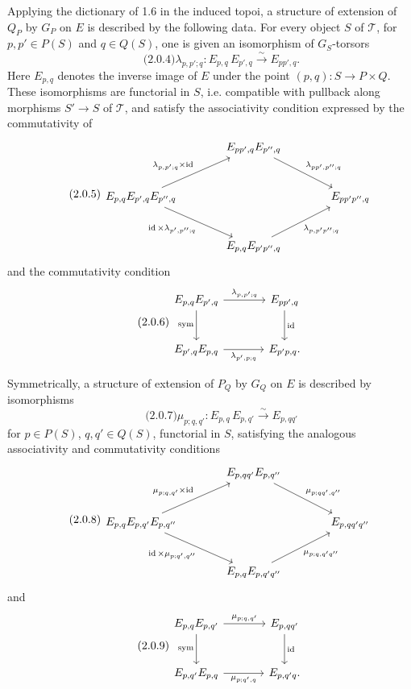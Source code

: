 \documentclass[11pt]{article}
\providecommand{\id}{\operatorname{id}}
\begin{document}
Applying the dictionary of 1.6 in the induced topoi, a structure of extension of \(Q_P\) by \(G_P\) on \(E\) is described by the following data.  For every object \(S\) of \(\mathcal T\), for \(p,p'\in P(S)\) and \(q\in Q(S)\), one is given an isomorphism of \(G_S\)-torsors
\begin{equation}\qquad\text{(2.0.4)}
  \lambda_{p,p';q}: E_{p,q}\,E_{p',q}\xrightarrow{\sim}E_{pp',q}.
\end{equation}
Here \(E_{p,q}\) denotes the inverse image of \(E\) under the point \((p,q):S\to P\times Q\).  These isomorphisms are functorial in \(S\), i.e. compatible with pullback along morphisms \(S'\to S\) of \(\mathcal T\), and satisfy the associativity condition expressed by the commutativity of
\begin{equation}\qquad\text{(2.0.5)}
\begin{tikzcd}[column sep=large,row sep=large]
& E_{pp',q}E_{p'',q}\arrow[dr,"\lambda_{pp',p'';q}"]&\\
E_{p,q}E_{p',q}E_{p'',q}
\arrow[ur,"\lambda_{p,p';q}\times\id"]
\arrow[dr,"\id\times\lambda_{p',p'';q}"']&&E_{pp'p'',q}\\
& E_{p,q}E_{p'p'',q}\arrow[ur,"\lambda_{p,p'p'';q}"']&
\end{tikzcd}
\end{equation}
and the commutativity condition
\begin{equation}\qquad\text{(2.0.6)}
\begin{tikzcd}[column sep=large,row sep=large]
E_{p,q}E_{p',q}\arrow[r,"\lambda_{p,p';q}"]\arrow[d,"\sym"']&E_{pp',q}\arrow[d,"\id"]\\
E_{p',q}E_{p,q}\arrow[r,"\lambda_{p',p;q}"']&E_{p'p,q}.
\end{tikzcd}
\end{equation}

Symmetrically, a structure of extension of \(P_Q\) by \(G_Q\) on \(E\) is described by isomorphisms
\begin{equation}\qquad\text{(2.0.7)}
  \mu_{p;q,q'}:E_{p,q}\,E_{p,q'}\xrightarrow{\sim}E_{p,qq'}
\end{equation}
for \(p\in P(S)\), \(q,q'\in Q(S)\), functorial in \(S\), satisfying the analogous associativity and commutativity conditions
\begin{equation}\qquad\text{(2.0.8)}
\begin{tikzcd}[column sep=large,row sep=large]
& E_{p,qq'}E_{p,q''}\arrow[dr,"\mu_{p;qq',q''}"]&\\
E_{p,q}E_{p,q'}E_{p,q''}
\arrow[ur,"\mu_{p;q,q'}\times\id"]
\arrow[dr,"\id\times\mu_{p;q',q''}"']&&E_{p,qq'q''}\\
& E_{p,q}E_{p,q'q''}\arrow[ur,"\mu_{p;q,q'q''}"']&
\end{tikzcd}
\end{equation}
and
\begin{equation}\qquad\text{(2.0.9)}
\begin{tikzcd}[column sep=large,row sep=large]
E_{p,q}E_{p,q'}\arrow[r,"\mu_{p;q,q'}"]\arrow[d,"\sym"']&E_{p,qq'}\arrow[d,"\id"]\\
E_{p,q'}E_{p,q}\arrow[r,"\mu_{p;q',q}"']&E_{p,q'q}.
\end{tikzcd}
\end{equation}
\end{document}
